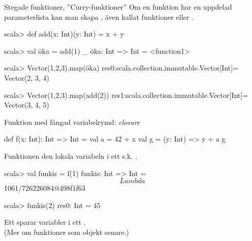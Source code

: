 \begin{Slide}{Stegade funktioner, ''Curry-funktioner''}
Om en funktion har en uppdelad parameterlista kan man skapa , även kallat  funktioner  eller .
\begin{REPLnonum}
scala> def add(x: Int)(y: Int) = x + y

scala> val öka = add(1) _
öka: Int => Int = <function1>

scala> Vector(1,2,3).map(öka)
res0:scala.collection.immutable.Vector[Int]= Vector(2, 3, 4)

scala> Vector(1,2,3).map(add(2))
res1:scala.collection.immutable.Vector[Int]= Vector(3, 4, 5)
\end{REPLnonum}
\end{Slide}


\begin{Slide}{Funktion med fångad variabelrymd: \textit{closure}}
\begin{Code}
def f(x: Int): Int => Int = {
  val a = 42 + x
  val g = (y: Int) => y + a
  g
}
\end{Code}
Funktionen   den lokala variabeln  i ett s.k. .
\pause
\begin{REPLnonum}
scala> val funkis = f(1)
funkis: Int => Int = $$Lambda$$1061/726226084@498f1f63

scala> funkis(2)
res0: Int = 45
\end{REPLnonum}
\pause
Ett  sparar variabler i ett . \\
(Mer om funktioner som objekt senare.)
\end{Slide}


